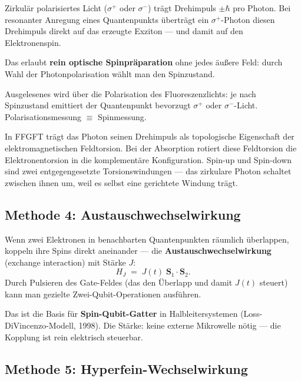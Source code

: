 Zirkulär polarisiertes Licht ($\sigma^+$ oder $\sigma^-$)
trägt Drehimpuls $\pm\hbar$ pro Photon.
Bei resonanter Anregung eines Quantenpunkts überträgt
ein $\sigma^+$-Photon diesen Drehimpuls direkt auf
das erzeugte Exziton --- und damit auf den Elektronenspin.

Das erlaubt \textbf{rein optische Spinpräparation}
ohne jedes äußere Feld: durch Wahl der Photonpolarisation
wählt man den Spinzustand.

Ausgelesenes wird über die Polarisation des
Fluoreszenzlichts: je nach Spinzustand emittiert der
Quantenpunkt bevorzugt $\sigma^+$ oder $\sigma^-$-Licht.
Polarisationsmessung $\equiv$ Spinmessung.

\begin{foundation}
In FFGFT trägt das Photon seinen Drehimpuls als
topologische Eigenschaft der elektromagnetischen
Feldtorsion. Bei der Absorption rotiert diese
Feldtorsion die Elektronentorsion in die
komplementäre Konfiguration.
Spin-up und Spin-down sind zwei entgegengesetzte
Torsionswindungen --- das zirkulare Photon
schaltet zwischen ihnen um, weil es selbst
eine gerichtete Windung trägt.
\end{foundation}

\subsection{Methode 4: Austauschwechselwirkung}
\label{sec:exchange}

Wenn zwei Elektronen in benachbarten Quantenpunkten
räumlich überlappen, koppeln ihre Spins direkt
aneinander --- die \textbf{Austauschwechselwirkung}
(exchange interaction) mit Stärke $J$:
\begin{equation}
  H_J \;=\; J(t)\;\mathbf{S}_1 \cdot \mathbf{S}_2.
\end{equation}
Durch Pulsieren des Gate-Feldes (das den Überlapp und
damit $J(t)$ steuert) kann man gezielte
Zwei-Qubit-Operationen ausführen.

Das ist die Basis für \textbf{Spin-Qubit-Gatter}
in Halbleitersystemen (Loss-DiVincenzo-Modell, 1998).
Die Stärke: keine externe Mikrowelle nötig ---
die Kopplung ist rein elektrisch steuerbar.

\subsection{Methode 5: Hyperfein-Wechselwirkung}
\label{sec:hyperfein}

